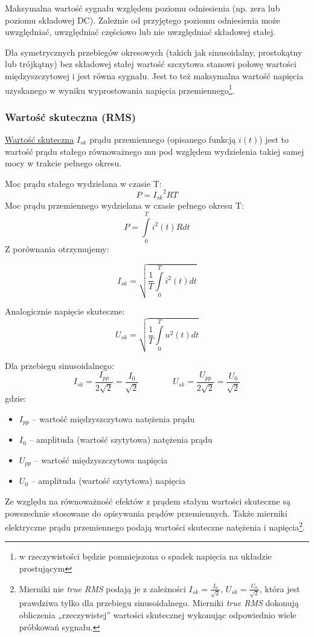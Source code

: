 Maksymalna wartość sygnału względem poziomu odniesienia (np. zera lub poziomu składowej DC).
Zależnie od przyjętego poziomu odniesienia może uwzględniać, uwzględniać częściowo lub nie uwzględniać składowej stałej.

Dla symetrycznych przebiegów okresowych (takich jak sinusoidalny, prostokątny lub trójkątny) bez składowej stałej wartość szczytowa stanowi połowę wartości międzyszczytowej i jest równa \href{https://en.wikipedia.org/wiki/Amplitude}{} sygnału. Jest to też maksymalna wartość napięcia uzyskanego w wyniku wyprostowania napięcia przemiennego\footnote{w rzeczywistości będzie pomniejszona o spadek napięcia na układzie prostującym}.

\subsubsection{Wartość skuteczna (RMS)}

\href{https://pl.wikipedia.org/wiki/Warto\%C5\%9B\%C4\%87_skuteczna}{Wartość skuteczna} $I_{sk}$ prądu przemiennego (opisanego funkcją $i(t)$) jest to wartość prądu stałego równoważnego mu pod względem wydzielenia takiej samej mocy w trakcie pełnego okresu.

\noindent
Moc prądu stałego wydzielana w czasie T: $$P = {I_{sk}}^2RT$$
Moc prądu przemiennego wydzielana w czasie pełnego okresu T: $$P = \int\limits^{T}_{0}{i^2(t)Rdt}$$
Z porównania otrzymujemy:

$$I_{sk} = \sqrt{\frac{1}{T}\int\limits^{T}_{0}{i^2(t)}dt}$$

\noindent
Analogicznie napięcie skuteczne:
$$U_{sk} = \sqrt{\frac{1}{T}\int\limits^{T}_{0}{u^2(t)}dt}$$

\noindent
Dla przebiegu sinusoidalnego:
	$$I_{sk} = \frac{I_{pp}}{2\sqrt{2}} = \frac{I_{0}}{\sqrt{2}} \qquad\qquad U_{sk} = \frac{U_{pp}}{2\sqrt{2}} = \frac{U_{0}}{\sqrt{2}}$$
gdzie:
\begin{itemize}
	\item $I_{pp}$ – wartość międzyszczytowa natężenia prądu
	\item $I_{0}$  – amplituda (wartość szytytowa) natężenia prądu
	\item $U_{pp}$ – wartość międzyszczytowa napięcia
	\item $U_{0}$  – amplituda (wartość szytytowa) napięcia
\end{itemize}

Ze względu na równoważność efektów z prądem stałym wartości skuteczne są powszechnie stosowane do opisywania prądów przemiennych.
Także mierniki elektryczne prądu przemiennego podają wartości skuteczne natężenia i napięcia\footnote{
	Mierniki nie \textit{true RMS} podają je z zależności $I_{sk} = \frac{I_{0}}{\sqrt{2}}$, $U_{sk} = \frac{U_{0}}{\sqrt{2}}$,
		która jest prawdziwa tylko dla przebiegu sinusoidalnego.
	Mierniki \textit{true RMS} dokonują obliczenia „rzeczywistej” wartości skutecznej wykonując odpowiednio wiele próbkowań sygnału.
}.


